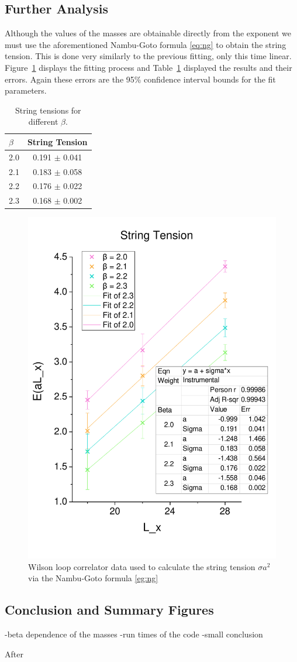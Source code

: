 \documentclass[12pt]{article}
\begin{document}
\subsection{Further Analysis}
Although the values of the masses are obtainable directly from the exponent we must use the aforementioned Nambu-Goto formula \eqref{eq:ng} to obtain the string tension. This is done very similarly to the previous fitting, only this time linear. Figure~\ref{fig:stringtension} displays the fitting process and Table~\ref{tab:string} displayed the results and their errors. Again these errors are the 95\% confidence interval bounds for the fit parameters.

\begin{table}
  \centering
    \begin{tabular}{l|c}
$\beta$ &  String Tension \\ \hline
2.0         &   0.191 $\pm$ 0.041 \\
2.1         &   0.183 $\pm$ 0.058 \\
2.2         &   0.176 $\pm$ 0.022 \\
2.3         &   0.168 $\pm$ 0.002 
\end{tabular}
\caption{String tensions for different $\beta$.}
\label{tab:string}
\end{table}

\begin{figure}
\centering
\includegraphics[width=0.8\linewidth]{stringtension.pdf}
\caption{\label{fig:stringtension} Wilson loop correlator data used to calculate the string tension $\sigma a^2$ via the Nambu-Goto formula \eqref{eg:ng}}
\end{figure}


\subsection{Conclusion and Summary Figures}
-beta dependence of the masses
-run times of the code
-small conclusion

\par After 
\end{document}
